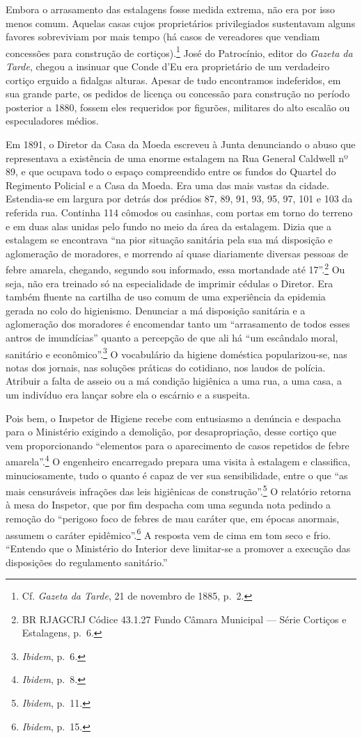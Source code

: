 Embora o arrasamento das estalagens fosse medida extrema, não era por
isso menos comum. Aquelas casas cujos proprietários privilegiados
sustentavam alguns favores sobreviviam por mais tempo (há casos de
vereadores que vendiam concessões para construção de
cortiços).\footnote{Cf. \textit{Gazeta da Tarde}, 21 de novembro de 1885,
  p.~2.} José do Patrocínio, editor do \textit{Gazeta da Tarde}, chegou a
insinuar que Conde d'Eu era proprietário de um verdadeiro cortiço
erguido a fidalgas alturas. Apesar de tudo encontramos indeferidos, em
sua grande parte, os pedidos de licença ou concessão para construção no
período posterior a 1880, fossem eles requeridos por figurões, militares
do alto escalão ou especuladores médios.

Em 1891, o Diretor da Casa da Moeda escreveu à Junta denunciando o abuso
que representava a existência de uma enorme estalagem na Rua General
Caldwell nº 89, e que ocupava todo o espaço compreendido entre os fundos
do Quartel do Regimento Policial e a Casa da Moeda. Era uma das mais
vastas da cidade. Estendia-se em largura por detrás dos prédios 87, 89,
91, 93, 95, 97, 101 e 103 da referida rua. Continha 114 cômodos ou
casinhas, com portas em torno do terreno e em duas alas unidas pelo
fundo no meio da área da estalagem. Dizia que a estalagem se encontrava
``na pior situação sanitária pela sua má disposição e aglomeração de
moradores, e morrendo aí quase diariamente diversas pessoas de febre
amarela, chegando, segundo sou informado, essa mortandade até
17''.\footnote{BR RJAGCRJ Códice 43.1.27 Fundo Câmara Municipal --- Série
  Cortiços e Estalagens, p.~6.} Ou seja, não era treinado só na
especialidade de imprimir cédulas o Diretor. Era também fluente na
cartilha de uso comum de uma experiência da epidemia gerada no colo do
higienismo. Denunciar a má disposição sanitária e a aglomeração dos
moradores é encomendar tanto um ``arrasamento de todos esses antros de
imundícias'' quanto a percepção de que ali há ``um escândalo moral,
sanitário e econômico''.\footnote{\textit{Ibidem}, p.~6.} O vocabulário da
higiene doméstica popularizou-se, nas notas dos jornais, nas soluções
práticas do cotidiano, nos laudos de polícia. Atribuir a falta de asseio
ou a má condição higiênica a uma rua, a uma casa, a um indivíduo era
lançar sobre ela o escárnio e a suspeita.

Pois bem, o Inspetor de Higiene recebe com entusiasmo a denúncia e
despacha para o Ministério exigindo a demolição, por desapropriação,
desse cortiço que vem proporcionando ``elementos para o aparecimento de
casos repetidos de febre amarela''.\footnote{\textit{Ibidem}, p.~8.} O
engenheiro encarregado prepara uma visita à estalagem e classifica,
minuciosamente, tudo o quanto é capaz de ver sua sensibilidade, entre o
que ``as mais censuráveis infrações das leis higiênicas de
construção''.\footnote{\textit{Ibidem}, p.~11.} O relatório retorna à mesa
do Inspetor, que por fim despacha com uma segunda nota pedindo a remoção
do ``perigoso foco de febres de mau caráter que, em épocas anormais,
assumem o caráter epidêmico''.\footnote{\textit{Ibidem}, p.~15.} A
resposta vem de cima em tom seco e frio. ``Entendo que o Ministério do
Interior deve limitar-se a promover a execução das disposições do
regulamento sanitário.''

